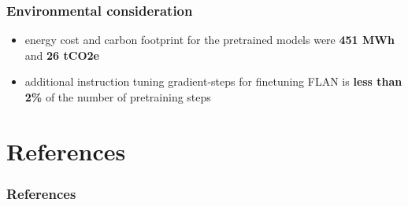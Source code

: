 \documentclass{beamer}
\begin{document}
\begin{frame}
    \frametitle{Environmental consideration}
    \begin{itemize}
        \item energy cost and carbon footprint for the pretrained models were \textbf{451 MWh} and \textbf{26 tCO2e}
        \item additional instruction tuning gradient-steps for finetuning FLAN is \textbf{less than 2\%} of the number of pretraining steps
    \end{itemize}
\end{frame}


\section{References}
\begin{frame}[allowframebreaks,t]
    \tiny
    \frametitle{References}
    
    
\end{frame}
\end{document}
